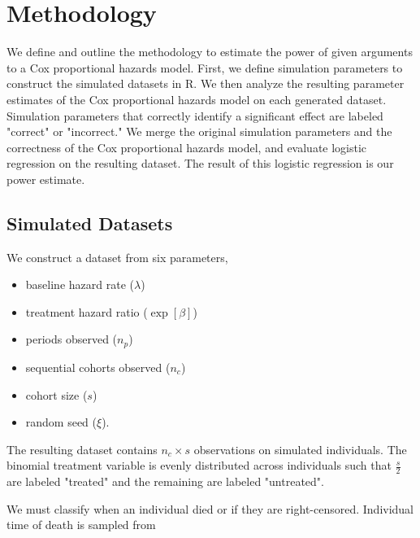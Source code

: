 \section{Methodology}
\label{sec:methodology}

We define and outline the methodology to estimate the power of given arguments to a Cox proportional hazards model. First, we define simulation parameters to construct the simulated datasets in R. We then analyze the resulting parameter estimates of the Cox proportional hazards model on each generated dataset. Simulation parameters that correctly identify a significant effect are labeled "correct" or "incorrect." We merge the original simulation parameters and the correctness of the Cox proportional hazards model, and evaluate logistic regression on the resulting dataset. The result of this logistic regression is our power estimate.


\subsection{Simulated Datasets}

We construct a dataset from six parameters\footnotemark,


\begin{itemize}
    \item baseline hazard rate ($\lambda$)
    \item treatment hazard ratio ($\exp[\beta]$)
    \item periods observed ($n_p$)
    \item sequential cohorts observed ($n_c$)
    \item cohort size ($s$)
    \item random seed ($\xi$).
\end{itemize}

The resulting dataset contains $n_c \times s$ observations on simulated individuals. The binomial treatment variable is evenly distributed across individuals such that $\frac{s}{2}$ are labeled "treated" and the remaining are labeled "untreated".

We must classify when an individual died or if they are right-censored. Individual time of death is sampled from\footnotemark 

